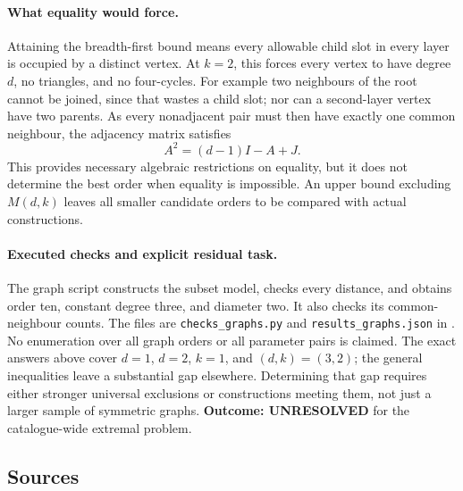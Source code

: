 \documentclass[11pt,a4paper]{article}
\begin{document}
\paragraph{What equality would force.}
Attaining the breadth-first bound means every allowable child slot in
every layer is occupied by a distinct vertex. At $k=2$, this forces
every vertex to have degree $d$, no triangles, and no four-cycles.
For example two neighbours of the root cannot be joined, since that
wastes a child slot; nor can a second-layer vertex have two parents.
As every nonadjacent pair must then have exactly one common neighbour,
the adjacency matrix satisfies
\[
                         A^2=(d-1)I-A+J.
\]
This provides necessary algebraic restrictions on equality, but it
does not determine the best order when equality is impossible.
An upper bound excluding $M(d,k)$ leaves all smaller candidate orders
to be compared with actual constructions.

\paragraph{Executed checks and explicit residual task.}
The graph script constructs the subset model, checks every distance,
and obtains order ten, constant degree three, and diameter two. It also
checks its common-neighbour counts. The files are
\texttt{checks\_graphs.py} and \texttt{results\_graphs.json} in
.
No enumeration over all graph orders or all parameter pairs is claimed.
The exact answers above cover $d=1$, $d=2$, $k=1$, and $(d,k)=(3,2)$;
the general inequalities leave a substantial gap elsewhere. Determining
that gap requires either stronger universal exclusions or constructions
meeting them, not just a larger sample of symmetric graphs.
\textbf{Outcome: UNRESOLVED} for the catalogue-wide extremal problem.

\subsection{Sources}
\end{document}
